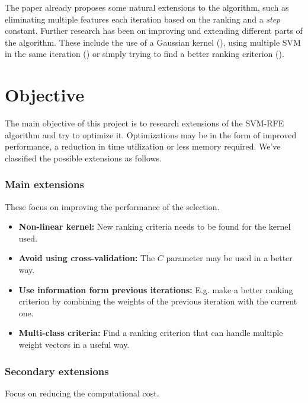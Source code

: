 The paper already proposes some natural extensions to the al\-go\-rithm, such as eliminating multiple features each iteration based on the ranking and a \emph{step} constant. Further research has been on improving and extending different parts of the al\-go\-rithm. These include the use of a Gaussian kernel (\cite{xue_nonlinear_2018}), using multiple SVM in the same iteration (\cite{wang_classification_2011}) or simply trying to find a better ranking criterion (\cite{mundra_svm-rfe_2007}).


\section{Objective}

The main objective of this project is to research extensions of the SVM-RFE algorithm and try to optimize it. Optimizations may be in the form of improved performance, a reduction in time utilization or less memory required. We've classified the possible extensions as follows.

\subsubsection*{Main extensions}

These focus on improving the performance of the selection.

\begin{itemize}
    \item \textbf{Non-linear kernel:} New ranking criteria needs to be found for the kernel used.
    \item \textbf{Avoid using cross-validation:} The $C$ parameter may be used in a better way.
    \item \textbf{Use information form previous iterations:} E.g. make a better ranking cri\-te\-rion by combining the weights of the previous iteration with the current one. 
    \item \textbf{Multi-class criteria:} Find a ranking criterion that can handle multiple weight vectors in a useful way.
\end{itemize}

\subsubsection*{Secondary extensions}

Focus on reducing the computational cost.

